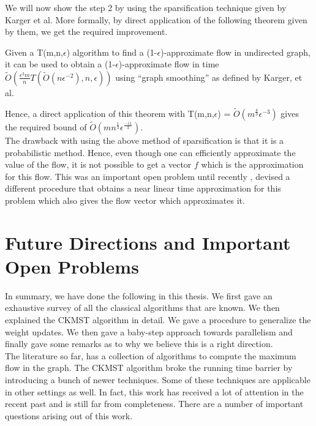 \documentclass[BTech]{iitmdiss}
\begin{document}
		We will now show the step 2 by using the sparsification technique given by Karger et al. More formally, by direct application of the 
		following theorem given by them, we get the required improvement. 
		
		\begin{thm}
		 Given a T(m,n,$\epsilon$) algorithm to find a (1-$\epsilon$)-approximate flow in undirected graph, it can be used to obtain 
		 a (1-$\epsilon$)-approximate flow in time $\widetilde{O}(\frac{\epsilon^2 m}{n}T(\widetilde{O}(n \epsilon^{-2}),n,\epsilon))$ using 
		 ``graph smoothing'' as defined by Karger, et al.
		\end{thm}

		Hence, a direct application of this theorem with T(m,n,$\epsilon$) = $\widetilde{O}(m^{\frac{4}{3}} \epsilon^{-3})$ gives 
		the required bound of $\widetilde{O}(mn^{\frac{1}{3}} \epsilon^{\frac{-11}{3}})$. \\
		
		The drawback with using the above method of sparsification is that it is a probabilistic method. Hence, even though one can efficiently
		approximate the value of the flow, it is not possible to get a vector $f$ which is the approximation for this flow. This was an important
		open problem until recently \cite{DBLP:journals/corr/abs-1304-2338}, devised a different procedure that obtains a near linear time approximation for this
		problem which also gives the flow vector which approximates it. 
		
		\chapter{Future Directions and Important Open Problems}
		  In summary, we have done the following in this thesis. We first gave an exhaustive survey of all the classical algorithms that are known.
		  We then explained the CKMST algorithm in detail. We gave a procedure to generalize the weight updates. We then gave a baby-step
		  approach towards parallelism and finally gave some remarks as to why we believe this is a right direction. \\
		
		    The literature so far, has a collection of algorithms to compute the maximum flow in the graph. The CKMST algorithm broke 
		the running time barrier by introducing a bunch of newer techniques. Some of these techniques are applicable in other settings as well.
		In fact, this work has received a lot of attention in the recent past and is still far from completeness.
		There are a number of important questions arising out of this work. \\
		 
\end{document}
